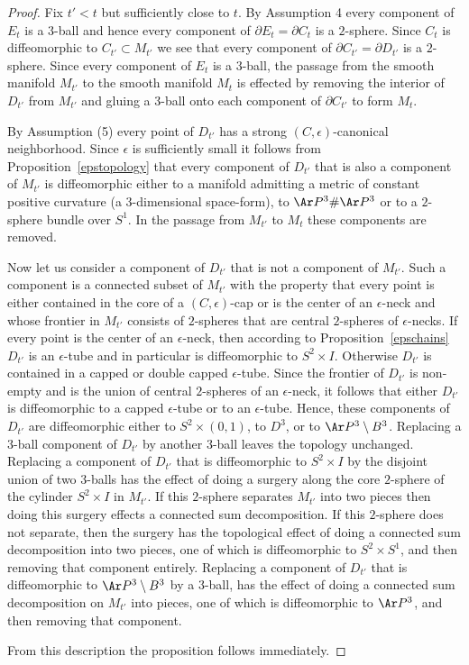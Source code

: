 \begin{proof}
Fix $t'<t$ but sufficiently close to $t$.
By Assumption 4 every component of $E_t$ is a $3$-ball and hence every component
of $\partial E_t=\partial C_t$ is a $2$-sphere. Since $C_t$ is diffeomorphic to
 $C_{t'}\subset M_{t'}$ we see that every component of $\partial C_{t'}=\partial
 D_{t'}$ is a $2$-sphere. Since every component of $E_t$ is a $3$-ball,
 the passage from the smooth manifold $M_{t'}$ to the smooth manifold
 $M_t$ is effected by removing the
 interior of $D_{t'}$ from $M_{t'}$ and gluing a $3$-ball onto each component of $\partial C_{t'}$
 to form $M_t$.

By Assumption (5) every point of $D_{t'}$ has a strong
$(C,\epsilon)$-canonical neighborhood. Since $\epsilon$ is
sufficiently small it follows from Proposition~\ref{epstopology}
that every component of $D_{t'}$ that is also a component of
$M_{t'}$ is diffeomorphic either to a manifold admitting a metric of
constant positive curvature (a $3$-dimensional space-form), to
$\Ar P^3\#\Ar P^3$ or to a $2$-sphere bundle over $S^1$. In the passage from
$M_{t'}$ to $M_t$ these components are removed.

Now let us consider a component of $D_{t'}$ that is not a component
of $M_{t'}$. Such a component is a connected subset of $M_{t'}$ with
the property that every point is either contained in the core of a
$(C,\epsilon)$-cap or is the center of an $\epsilon$-neck and whose
frontier in $M_{t'}$ consists of $2$-spheres that are central
$2$-spheres of $\epsilon$-necks. If every point is the center of an
$\epsilon$-neck, then according to Proposition~\ref{epschains}
$D_{t'}$ is an $\epsilon$-tube and in particular is diffeomorphic to
$S^2\times I$. Otherwise $D_{t'}$ is contained in a capped or double
capped $\epsilon$-tube. Since the frontier of $D_{t'}$ is non-empty
and is the union of central $2$-spheres of an $\epsilon$-neck, it
follows that either $D_{t'}$ is diffeomorphic to a capped
$\epsilon$-tube or to an $\epsilon$-tube. Hence, these components of
$D_{t'}$ are diffeomorphic either to $S^2\times (0,1)$, to $D^3$, or
to $\Ar P^3\setminus B^3$. Replacing a $3$-ball component of
$D_{t'}$ by another $3$-ball leaves the topology unchanged.
Replacing a component of $D_{t'}$ that is diffeomorphic to
$S^2\times I$ by the disjoint union of two $3$-balls  has the
effect of doing a surgery along the core $2$-sphere of the cylinder
$S^2\times I$ in $M_{t'}$. If this $2$-sphere separates $M_{t'}$
into two pieces then doing this surgery effects a connected sum
decomposition. If this $2$-sphere does not separate, then the
surgery has the topological effect of doing a connected sum
decomposition into two pieces, one of which is diffeomorphic to
$S^2\times S^1$, and then removing that component entirely.
Replacing a component of $D_{t'}$ that is diffeomorphic to $\Ar
P^3\setminus B^3$ by a $3$-ball, has the effect of doing a
connected sum decomposition on $M_{t'}$ into pieces, one of which is
diffeomorphic to $\Ar P^3$, and then removing that component.

 From this description the proposition follows immediately.
\end{proof}


